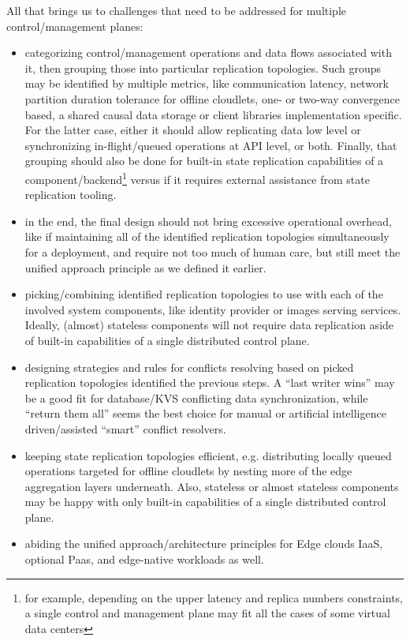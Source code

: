\documentclass[conference]{IEEEtran}
\begin{document}
All that brings us to challenges that need to be addressed for multiple
control/management planes:
\begin{itemize}
  \item categorizing control/management operations and data flows associated
    with it, then grouping those into particular replication topologies. Such
    groups may be identified by multiple metrics, like communication latency,
    network partition duration tolerance for offline cloudlets, one- or two-way
    convergence based, a shared causal data storage or client libraries
    implementation specific. For the latter case, either it should allow
    replicating data low level or synchronizing in-flight/queued operations at
    API level, or both. Finally, that grouping should also be done for built-in
    state replication capabilities of a component/backend\footnote{for example,
    depending on the upper latency and replica numbers constraints, a single
    control and management plane may fit all the cases of some virtual data
    centers\cite{b3}} versus if it requires external assistance from state
    replication tooling.
  \item in the end, the final design should not bring excessive operational
    overhead, like if maintaining all of the identified replication topologies
    simultaneously for a deployment, and require not too much of human care,
    but still meet the unified approach principle as we defined it earlier.
  \item picking/combining identified replication topologies to use with each of
    the involved system components, like identity provider or images serving
    services. Ideally, (almost) stateless components will not require data
    replication aside of built-in capabilities of a single distributed control
    plane.
  \item designing strategies and rules for conflicts resolving based on picked
    replication topologies identified the previous steps. A ``last writer
    wins'' may be a good fit for database/KVS conflicting data synchronization,
    while ``return them all'' seems the best choice for manual or artificial
    intelligence driven/assisted ``smart'' conflict resolvers.
  \item keeping state replication topologies efficient, e.g. distributing
    locally queued operations targeted for offline cloudlets by nesting more of
    the edge aggregation layers underneath. Also, stateless or almost stateless
    components may be happy with only built-in capabilities of a single
    distributed control plane.
  \item abiding the unified approach/architecture principles for Edge clouds
    IaaS, optional Paas, and edge-native workloads as well.
\end{itemize}
\end{document}
